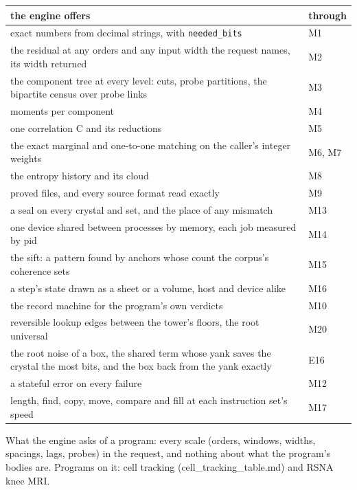 {\small
\setlength{\tabcolsep}{6pt}
\begin{longtable}{>{\RaggedRight\arraybackslash}p{}>{\RaggedRight\arraybackslash}p{}}
\toprule
the engine offers & through \\
\midrule
\endhead
exact numbers from decimal strings, with \texttt{needed\_\allowbreak{}bits} & M1 \\
the residual at any orders and any input width the request names, its width returned & M2 \\
the component tree at every level: cuts, probe partitions, the bipartite census over probe links & M3 \\
moments per component & M4 \\
one correlation C and its reductions & M5 \\
the exact marginal and one-to-one matching on the caller's integer weights & M6, M7 \\
the entropy history and its cloud & M8 \\
proved files, and every source format read exactly & M9 \\
a seal on every crystal and set, and the place of any mismatch & M13 \\
one device shared between processes by memory, each job measured by pid & M14 \\
the sift: a pattern found by anchors whose count the corpus's coherence sets & M15 \\
a step's state drawn as a sheet or a volume, host and device alike & M16 \\
the record machine for the program's own verdicts & M10 \\
reversible lookup edges between the tower's floors, the root universal & M20 \\
the root noise of a box, the shared term whose yank saves the crystal the most bits, and the box back from the yank exactly & E16 \\
a stateful error on every failure & M12 \\
length, find, copy, move, compare and fill at each instruction set's speed & M17 \\
\bottomrule
\end{longtable}
}

What the engine asks of a program: every scale (orders, windows, widths, spacings, lags, probes) in the request, and nothing about what the program's bodies are. Programs on it: cell tracking (cell\_\allowbreak{}tracking\_\allowbreak{}table.md) and RSNA knee MRI.

